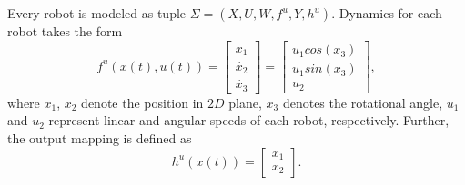 Every robot is modeled as tuple $\Sigma=(X,U,W,f^u,Y,h^u)$. %
Dynamics for each robot takes the form
\begin{equation*}\label{eq:unicycle_ss}
	f^{u}(x(t),u(t))=
	\begin{bmatrix}
		\dot{x_1}\\
		\dot{x_2}\\
		\dot{x_3}
	\end{bmatrix}=
	\begin{bmatrix}
		u_1cos(x_3)\\
		u_1sin(x_3)\\
		u_2
	\end{bmatrix},
\end{equation*}
where $x_1$, $x_2$ denote the position in $2D$ plane, $x_3$ denotes the rotational angle, $u_1$ and $u_2$ represent linear and angular speeds of each robot, respectively. Further, the output mapping is defined as
\[
h^u(x(t))=\begin{bmatrix}
	x_1\\x_2
\end{bmatrix}.
\]


